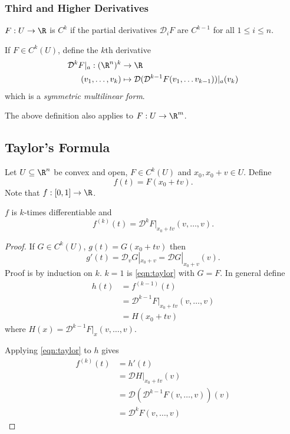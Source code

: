 \documentclass[a4paper]{article}
\newcommand*{\D}{\mathcal{D}}
\theoremstyle{definition}
\begin{document}
\subsubsection{Third and Higher Derivatives}

\begin{definition}[\(C^k\) space]
  \(F: U \to \R\) is \(C^k\) if the partial derivatives \(\D_i F\) are \(C^{k - 1}\) for all \(1 \leq i \leq n\).

  If \(F \in C^k(U)\), define the \(k\)th derivative
  \begin{align*}
    \D^k F|_a: (\R^n)^k &\to \R \\
    (v_1, \dots, v_k) &\mapsto \D( \D^{k - 1} F(v_1, \dots v_{k - 1}))|_a (v_k)
  \end{align*}
  which is a \emph{symmetric multilinear form}.
\end{definition}

\begin{note}
  The above definition also applies to \(F: U \to \R^m\).
\end{note}

\subsection{Taylor's Formula}

Let \(U \subseteq \R^n\) be convex and open, \(F \in C^k(U)\) and \(x_0, x_0 + v \in U\). Define
\[
  f(t) = F(x_0 + tv).
\]
Note that \(f: [0, 1] \to \R\).

\begin{proposition}
  \(f\) is \(k\)-times differentiable and
  \[
    f^{(k)}(t) = \D^k F|_{x_0 + tv} (v, \dots, v).
  \]
\end{proposition}

\begin{proof}
  If \(G \in C^k(U)\), \(g(t) = G(x_0 + tv)\) then
  \begin{equation*}
    \label{eqn:taylor}
    g'(t) = \D_v G|_{x_0 + v} = \D G|_{x_0 + v} (v).
    \tag{\(\ast\)}
  \end{equation*}
  Proof is by induction on \(k\). \(k = 1\) is \eqref{eqn:taylor} with \(G = F\). In general define
  \begin{align*}
    h(t) &= f^{(k - 1)}(t) \\
         &= \D^{k - 1} F|_{x_0 + tv} (v, \dots, v) \\
         &= H(x_0 + tv)
  \end{align*}
  where \(H(x) = \D^{k - 1} F|_x(v, \dots, v)\).

  Applying \eqref{eqn:taylor} to \(h\) gives
  \begin{align*}
    f^{(k)}(t) &= h'(t) \\
               &= \D H|_{x_0 + tv}(v) \\
               &= \D( \D^{k - 1} F(v, \dots, v))(v) \\
               &= \D^k F(v, \dots, v)
  \end{align*}
\end{proof}
\end{document}
